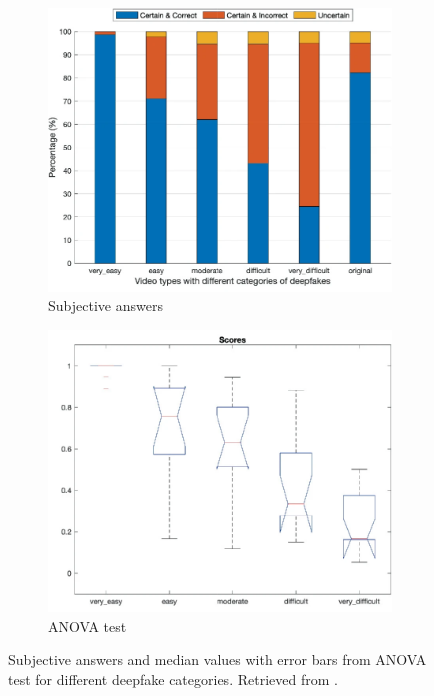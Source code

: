 \begin{figure}[H]
    \begin{subfigure}[h]{.475\linewidth}
        \centering
        \includegraphics[width=1\linewidth]{other-fig/subjective_answers_a.png}
        \caption{Subjective answers}
    \end{subfigure}
    \hfill
    \begin{subfigure}[h]{.475\linewidth}
        \centering
        \includegraphics[width=1\linewidth]{other-fig/subjective_answers_b.png}
        \caption{ANOVA test}
    \end{subfigure}
    \caption{Subjective answers and median values with error bars from ANOVA test for different deepfake categories. Retrieved from \cite{TheThreatOfDeepfakes}.}
    \label{fig:subjective_answers}
\end{figure}

